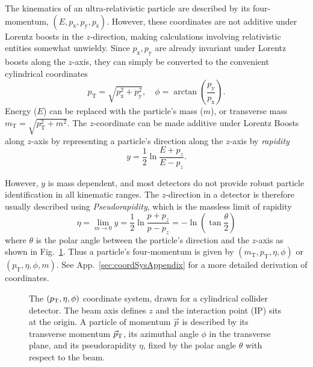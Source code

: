  The kinematics of an ultra-relativistic particle are described by its four-momentum, \((E, p_\mathrm{x}, p_\mathrm{y}, p_\mathrm{z})\). However, these coordinates are not additive under Lorentz boosts in the \(z\)-direction, making calculations involving relativistic entities somewhat unwieldy.  Since \(p_\mathrm{x}, p_\mathrm{y}\) are already invariant under Lorentz boosts along the \(z\)-axis, they can simply be converted to the convenient cylindrical coordinates
 \begin{equation}
 	p_\mathrm{T} = \sqrt{p_\mathrm{x}^2 + p_\mathrm{y}^2},\quad \phi = \arctan(\frac{p_\mathrm{y}}{p_\mathrm{x}}). 
 \end{equation}
 Energy (\(E\)) can be replaced with the particle's mass (\(m\)), or transverse mass \(m_\mathrm{T} = \sqrt{p_\mathrm{T}^2 + m^2}\).
 The \(z\)-coordinate can be made additive under Lorentz Boosts along \(z\)-axis by representing a particle's direction along the \(z\)-axis by \emph{rapidity}
\begin{equation}
		y  = \frac{1}{2} \ln \frac{E + p_z}{E - p_z}. 
\end{equation}

However, \(y\) is mass dependent, and most detectors do not provide robust particle identification in all kinematic ranges. The \(z\)-direction in a detector is therefore usually described using \emph{Pseudorapidity}, which is the massless limit of rapidity
\begin{equation}
	\eta = \lim_{m\to 0} y= \frac{1}{2} \ln \frac{p + p_z}{p - p_z}  = -\ln(\tan\frac{\theta}{2})
\end{equation}
where \(\theta\) is the polar angle between the particle's direction and the \(z\)-axis as shown in Fig.~\ref{fig:detcoords}. Thus a particle's four-momentum is given by \((m_\mathrm{T}, p_\mathrm{T}, \eta, \phi)\) or \((p_\mathrm{T}, \eta, \phi, m)\).  See App.~\ref{sec:coordSysAppendix} for a more detailed derivation of coordinates.

\begin{figure}
	\centering
	\detectorCoordinateSystem
	\caption[The \((p_\mathrm{T}, \eta, \phi)\) coordinate system of a collider detector]{The \((p_{\rm T}, \eta, \phi)\) coordinate system, drawn for a cylindrical
		collider detector. The beam axis defines \(z\) and the interaction point (IP) sits at
		the origin. A particle of momentum \(\vec{p}\) is described by its transverse momentum
		\(\vec{p}_{\rm T}\), its azimuthal angle \(\phi\) in the transverse plane, and its
		pseudorapidity \(\eta\), fixed by the polar angle \(\theta\) with respect to the beam.}
	\label{fig:detcoords}
\end{figure}

